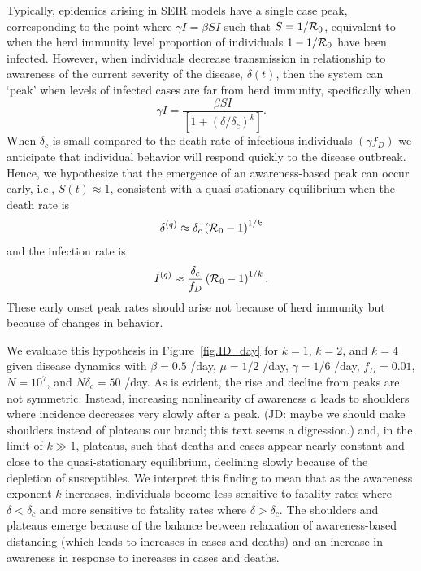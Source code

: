 Typically, epidemics arising in SEIR models have a single case peak, corresponding 
to the point where $\gamma I = \beta S I $ such that 
$S=1/{\cal{R}}_0$, equivalent to when the herd
immunity level proportion of individuals
$1-1/{\cal{R}}_0$ have been infected.
However, when individuals decrease transmission in relationship
to awareness of the current severity of the disease, $\delta(t)$,
then the system can `peak' when levels of infected cases are
far from herd immunity, specifically when
\begin{equation}
\gamma I = \frac{\beta SI}{\left[1+\left(\delta/\delta_c\right)^{k}\right]}.
\end{equation}
When $\delta_c$ is small compared to the death rate of infectious individuals $(\gamma f_D)$ we anticipate that individual behavior will respond quickly to the disease outbreak.
Hence, we hypothesize that the
emergence of an
awareness-based peak can occur early, i.e., $S(t)\approx 1$, consistent
with a quasi-stationary equilibrium when the death rate is
\begin{equation}
\delta^{(q)} \approx \delta_c\left({\cal{R}}_0-1\right)^{1/k}
\end{equation}
and the infection rate is
\begin{equation}
\dot{I}^{(q)} \approx \frac{\delta_c}{f_D}\left({\cal{R}}_0-1\right)^{1/k}.
\end{equation}
These early onset peak rates should arise not because
of herd immunity but because of changes in behavior. 

We evaluate this hypothesis in
Figure~\ref{fig.ID_day} for $k=1$, $k=2$, and $k=4$
given disease dynamics with $\beta=0.5$ /day, $\mu=1/2$ /day, $\gamma=1/6$
/day,
$f_D=0.01$, $N=10^7$, and $N\delta_c=50$ /day.  
As is evident, the rise and decline from peaks are not symmetric. Instead,
increasing nonlinearity of awareness
$a$ leads to shoulders where incidence decreases very slowly after a peak.
(JD: maybe we should make shoulders instead of plateaus our brand; this text seems a digression.)
and, in the limit of $k\gg 1$, plateaus, such that
deaths and cases appear nearly constant and close to the quasi-stationary
equilibrium, declining slowly because of the
depletion of susceptibles.  
We interpret this finding to mean that as the awareness exponent $k$ increases,
individuals become less sensitive to fatality rates
where $\delta < \delta_c$ and more sensitive to fatality rates where $\delta > \delta_c$.  
The shoulders and plateaus emerge because of the balance
between relaxation of awareness-based
distancing (which leads to increases in cases and deaths) and an 
increase in awareness in response to increases in cases and deaths.  

